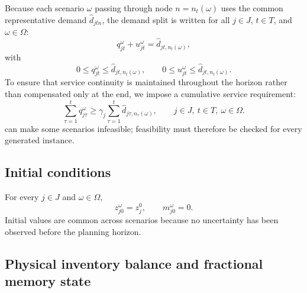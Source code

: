 \documentclass[11pt,a4paper]{article}
\begin{document}
Because each scenario \(\omega\) passing through node
\(n=n_t(\omega)\) uses the common representative demand
\(\widehat{d}_{jtn}\), the demand split is written for all
\(j\in J\), \(t\in T\), and \(\omega\in\Omega\):
\begin{equation}
  q_{jt}^{\omega}+u_{jt}^{\omega}
  =
  \widehat{d}_{jt,n_t(\omega)},
  \label{eq:demand-split}
\end{equation}
with
\begin{equation}
  0\leq q_{jt}^{\omega}\leq \widehat{d}_{jt,n_t(\omega)},
  \qquad
  0\leq u_{jt}^{\omega}\leq \widehat{d}_{jt,n_t(\omega)}.
  \label{eq:demand-bounds}
\end{equation}
To ensure that service continuity is maintained throughout the horizon
rather than compensated only at the end, we impose a cumulative service
requirement:
\begin{equation}
  \sum_{\tau=1}^{t}q_{j\tau}^{\omega}
  \geq
  \gamma_j
  \sum_{\tau=1}^{t}\widehat{d}_{j\tau,n_\tau(\omega)},
  \qquad
  j\in J,\ t\in T,\ \omega\in\Omega.
  \label{eq:service}
\end{equation}
 can make some scenarios infeasible; feasibility must
therefore be checked for every generated instance.

\subsection{Initial conditions}

For every \(j\in J\) and \(\omega\in\Omega\),
\begin{equation}
  z_{j0}^{\omega}=z_j^0,
  \qquad
  m_{j0}^{\omega}=0.
  \label{eq:initial-condition}
\end{equation}
Initial values are common across scenarios because no uncertainty has
been observed before the planning horizon.

\subsection{Physical inventory balance and fractional memory state}
\end{document}
